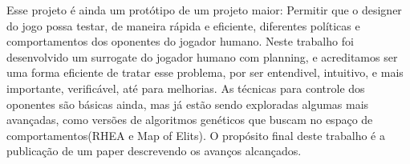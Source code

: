 \documentclass[]{book}
\begin{document}
Esse projeto é ainda um protótipo de um projeto maior: Permitir que o
designer do jogo possa testar, de maneira rápida e eficiente, diferentes
políticas e comportamentos dos oponentes do jogador humano. Neste
trabalho foi desenvolvido um surrogate do jogador humano com planning, e
acreditamos ser uma forma eficiente de tratar esse problema, por ser
entendivel, intuitivo, e mais importante, verificável, até para
melhorias. As técnicas para controle dos oponentes são básicas ainda,
mas já estão sendo exploradas algumas mais avançadas, como versões de
algoritmos genéticos que buscam no espaço de comportamentos(RHEA e Map
of Elits). O propósito final deste trabalho é a publicação de um paper
descrevendo os avanços alcançados.


\end{document}
